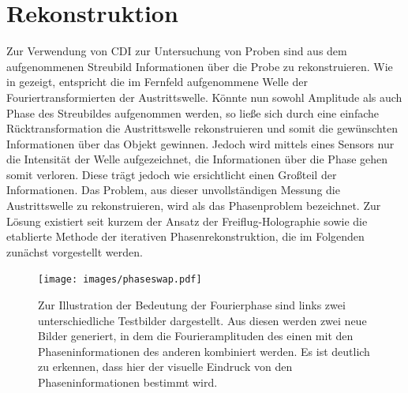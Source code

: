 \chapter{Rekonstruktion}
Zur Verwendung von CDI zur Untersuchung von Proben sind aus dem aufgenommenen Streubild Informationen über die Probe zu rekonstruieren. Wie in  gezeigt, entspricht die im Fernfeld aufgenommene Welle der Fouriertransformierten der Austrittswelle. Könnte nun sowohl Amplitude als auch Phase des Streubildes aufgenommen werden, so ließe sich durch eine einfache Rücktransformation die Austrittswelle rekonstruieren und somit die gewünschten Informationen über das Objekt gewinnen. Jedoch wird mittels eines Sensors nur die Intensität der Welle aufgezeichnet, die Informationen über die Phase gehen somit verloren. Diese trägt jedoch wie  ersichtlicht einen Großteil der Informationen. Das Problem, aus dieser unvollständigen Messung die Austrittswelle zu rekonstruieren, wird als das Phasenproblem bezeichnet. Zur Lösung existiert seit kurzem der Ansatz der Freiflug-Holographie sowie die etablierte Methode der iterativen Phasenrekonstruktion, die im Folgenden zunächst vorgestellt werden.

\begin{figure}
	\centering
	\texttt{[image: images/phaseswap.pdf]}
	\caption[Bedeutung der Fourierphase]{Zur Illustration der Bedeutung der Fourierphase sind links zwei unterschiedliche Testbilder dargestellt. Aus diesen werden zwei neue Bilder generiert, in dem die Fourieramplituden des einen mit den Phaseninformationen des anderen kombiniert werden. Es ist deutlich zu erkennen, dass hier der visuelle Eindruck von den Phaseninformationen bestimmt wird.}
	\label{fig:phaseswap}
\end{figure}
